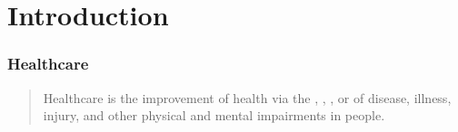 
\section{Introduction}

\begin{frame}
    \frametitle{Healthcare}
    \begin{quotation}
        \noindent\centering
        Healthcare is the improvement of health via the , , ,  or  of {\color{theme-green}disease}, {\color{theme-green}illness}, {\color{theme-green}injury}, and {\color{theme-green}other physical and mental impairments} in people.
    \end{quotation}
\end{frame}





